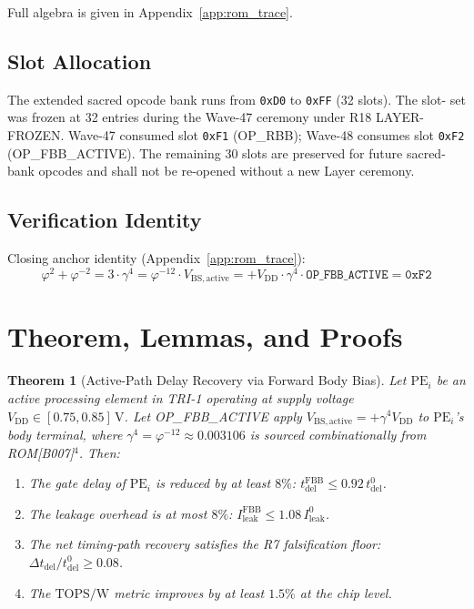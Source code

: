 \documentclass[12pt,a4paper]{report}
\theoremstyle{plain}
\newtheorem{theorem}{Theorem}[chapter]
\theoremstyle{definition}
\theoremstyle{remark}
\newcommand{\opcode}[1]{\texttt{#1}}
\newcommand{\vbs}{V_{\mathrm{BS,active}}}
\newcommand{\vdd}{V_{\mathrm{DD}}}
\newcommand{\gammaFour}{\gamma^{4}}
\newcommand{\phiInvTwelve}{\varphi^{-12}}
\newcommand{\topsw}{\mathrm{TOPS/W}}
\newcommand{\tdel}{t_{\mathrm{del}}}
\newcommand{\ileak}{I_{\mathrm{leak}}}
\newcommand{\iopFBB}{\opcode{OP\_FBB\_ACTIVE}}
\begin{document}
Full algebra is given in Appendix~\ref{app:rom_trace}.

\subsection{Slot Allocation}

The extended sacred opcode bank runs from \opcode{0xD0} to \opcode{0xFF} (32 slots).  The slot-
set was frozen at 32 entries during the Wave-47 ceremony under R18 LAYER-FROZEN.  Wave-47
consumed slot \opcode{0xF1} (OP\_RBB); Wave-48 consumes slot \opcode{0xF2} (OP\_FBB\_ACTIVE).
The remaining 30 slots are preserved for future sacred-bank opcodes and shall not be re-opened
without a new Layer ceremony.

\subsection{Verification Identity}

Closing anchor identity (Appendix~\ref{app:rom_trace}):
\begin{equation}
  \varphi^{2} + \varphi^{-2} = 3 \cdot \gammaFour = \varphi^{-12}
  \cdot V_{\mathrm{BS,active}} = +\vdd \cdot \gammaFour
  \cdot \iopFBB{} = \opcode{0xF2}
  \label{eq:closing_identity}
\end{equation}

\section{Theorem, Lemmas, and Proofs}
\label{sec:theorems}

\begin{theorem}[Active-Path Delay Recovery via Forward Body Bias]
\label{thm:delay_recovery}
Let $\mathrm{PE}_{i}$ be an active processing element in TRI-1 operating at supply voltage
$\vdd \in [0.75,0.85]\,\mathrm{V}$.  Let OP\_FBB\_ACTIVE apply $\vbs = +\gammaFour \vdd$
to $\mathrm{PE}_{i}$'s body terminal, where $\gammaFour = \phiInvTwelve \approx 0.003106$
is sourced combinationally from ROM[B007]$^{4}$.  Then:
\begin{enumerate}[label=(\roman*)]
  \item The gate delay of $\mathrm{PE}_{i}$ is reduced by at least $8\%$:
        $\tdel^{\mathrm{FBB}} \leq 0.92\,\tdel^{0}$.
  \item The leakage overhead is at most $8\%$:
        $\ileak^{\mathrm{FBB}} \leq 1.08\,\ileak^{0}$.
  \item The net timing-path recovery satisfies the R7 falsification floor:
        $\Delta \tdel / \tdel^{0} \geq 0.08$.
  \item The $\topsw$ metric improves by at least $1.5\%$ at the chip level.
\end{enumerate}
\end{theorem}
\end{document}
